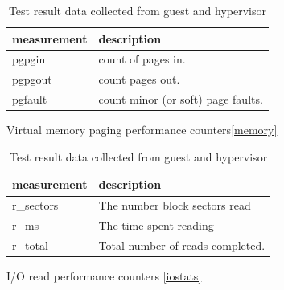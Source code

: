 \begin{table}[h]
\begin{subtable}[h]{0.45\textwidth}
\begin{tabular}{ l p{5cm} }
       measurement & description \\
       \hline
       pgpgin  &  count of pages in. \\
       pgpgout  & count pages out. \\
       pgfault  & count minor (or soft) page faults. \\
       \hline
\end{tabular}
\caption{Virtual memory paging performance counters\ref{memory}}
\label{fig:memory}
\end{subtable}
\hfill
\begin{subtable}[h]{0.45\textwidth}
\begin{tabular}{ l p{5cm} }
       measurement & description \\
       \hline
       r\_sectors & The number block sectors read \\
       r\_ms & The time spent reading \\
       r\_total & Total number of reads completed. \\
       \hline
\end{tabular}
\caption{I/O read performance counters \ref{iostats}}
\label{fig:io}
\end{subtable}
\caption{Test result data collected from guest and hypervisor}
\end{table}

